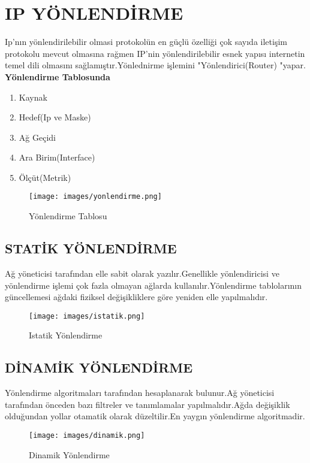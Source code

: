 \section{IP YÖNLENDİRME}

Ip'nın yönlendirilebilir olmasi protokolün  en güçlü özelliği çok sayıda iletişim protokolu mevcut olmasına rağmen IP'nin yönlendirilebilir esnek yapısı internetin temel dili olmasını sağlamıştır.Yönlednirme işlemini "Yönlendirici(Router) "yapar.
\textbf{Yönlendirme Tablosunda}\\
\begin{enumerate}[label=\alph*)] 
   \item Kaynak
   \item Hedef(Ip ve Maske)
   \item Ağ Geçidi
   \item Ara Birim(Interface)
   \item Ölçüt(Metrik)
\end{enumerate}

\begin{figure}[ht]
    \centering
    \texttt{[image: images/yonlendirme.png]}
    \caption{Yönlendirme Tablosu}
    \label{fig:bandwidth_example}
\end{figure}

\subsection{STATİK YÖNLENDİRME}
Ağ yöneticisi tarafından elle sabit olarak yazılır.Genellikle yönlendiricisi ve yönlendirme işlemi çok fazla olmayan ağlarda kullanılır.Yönlendirme tablolarının güncellemesi ağdaki fiziksel değişikliklere göre yeniden elle yapılmalıdır.\\
\begin{figure}[ht]
    \centering
    \texttt{[image: images/istatik.png]}
    \caption{Istatik Yönlendirme}
    \label{fig:bandwidth_example}
\end{figure}
\subsection{DİNAMİK YÖNLENDİRME}
Yönlendirme algoritmaları  tarafından hesaplanarak bulunur.Ağ yöneticisi tarafından önceden bazı filtreler ve tanımlamalar yapılmalıdır.Ağda değişiklik olduğundan yollar otamatik olarak düzeltilir.En yaygın yönlendirme algoritmadir.\\
\begin{figure}[ht]
    \centering
    \texttt{[image: images/dinamik.png]}
    \caption{Dinamik Yönlendirme}
    \label{fig:bandwidth_example}
\end{figure}

